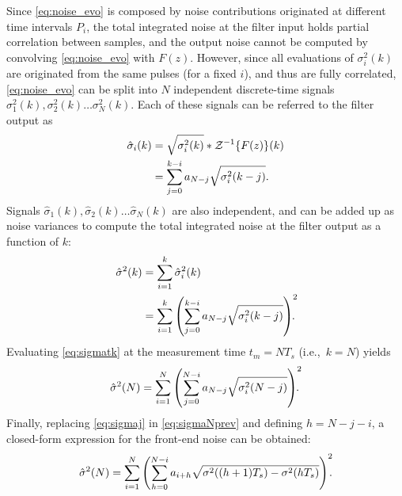 Since \eqref{eq:noise_evo} is composed by noise contributions originated at different time intervals $P_i$, the total integrated noise at the filter input holds partial correlation between samples, and the output noise cannot be computed by convolving \eqref{eq:noise_evo} with $F(z)$. However, since all evaluations of $\sigma_i^2(k)$ are originated from the same pulses (for a fixed $i$), and thus are fully correlated, \eqref{eq:noise_evo} can be split into $N$ independent \mbox{discrete-time} signals $\sigma_1^2(k), \sigma_2^2(k) \ldots \sigma_N^2(k)$. Each of these signals can be referred to the filter output as
\begin{align}
\hat{\sigma}_i(k) &= \sqrt{\sigma^2_i(k) } \ast \mathcal{Z}^{-1}\!\left\{ F(z) \right\}\hspace{-0.15em}(k) \nonumber \\
          &= \sum_{j=0}^{k-i} a_{N-j} \sqrt{\sigma^2_i(k-j)}.  \label{eq:sigmao}
\end{align}
Signals $\hat{\sigma}_1(k), \hat{\sigma}_2(k) \ldots \hat{\sigma}_N(k)$ are also independent, and can be added up as noise variances to compute the total integrated noise at the filter output as a function of $k$:
\begin{align}
\hat{\sigma}^2(k) &= \sum_{i=1}^k \hat{\sigma}_i^2(k) \nonumber \\
		       &= \sum_{i=1}^k \left(\sum_{j=0}^{k-i} a_{N-j}\sqrt{\sigma_i^2(k-j)}\right)^2 \hspace*{-7pt}.  \label{eq:sigmatk}
\end{align}
Evaluating \eqref{eq:sigmatk} at the measurement time \mbox{$t_m=NT_s$} \mbox{(i.e., $k=N$)} yields
\begin{align}
\hat{\sigma}^2(N) = \sum_{i=1}^N \left(\sum_{j=0}^{N-i} a_{N-j}\sqrt{\sigma_i^2(N-j)}\right)^2\hspace*{-7pt}.\hspace{0.2em} \label{eq:sigmaNprev}
\end{align}
Finally, replacing \eqref{eq:sigmaj} in \eqref{eq:sigmaNprev} and defining $h = N-j-i$, a closed-form expression for the front-end noise can be obtained:
\begin{equation}
\hat{\sigma}^2(N) = \sum_{i=1}^N \left( \sum_{h=0}^{N-i} a_{i+h} \sqrt{\sigma^2((h+1)T_s)-\sigma^2(hT_s)}\right)^2\hspace{-0.5em}. \label{eq:final}
\end{equation}

